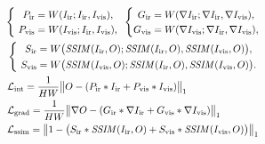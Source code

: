 \begin{gather}
    \left\{
    \scalebox{0.8}{
        $\begin{aligned}
            P_{\mathrm{ir}}   &= W(I_{\mathrm{ir}}; I_{\mathrm{ir}}, I_{\mathrm{vis}}), \\
            P_{\mathrm{vis}}  &= W(I_{\mathrm{vis}}; I_{\mathrm{ir}}, I_{\mathrm{vis}}),
        \end{aligned}$
    }
    \right.
    \left\{
     \scalebox{0.8}{$\begin{aligned}
            G_{\mathrm{ir}}   &= W(\nabla I_{\mathrm{ir}}; \nabla I_{\mathrm{ir}}, \nabla I_{\mathrm{vis}}), \\
            G_{\mathrm{vis}}  &= W(\nabla I_{\mathrm{vis}}; \nabla I_{\mathrm{ir}}, \nabla I_{\mathrm{vis}}),
        \end{aligned}$}
    \right.
    \\
    \left\{
        \scalebox{0.8}{
        $\begin{aligned}
            S_{\mathrm{ir}}   &= W\bigl(\mathit{SSIM}(I_{\mathrm{ir}}, O); \mathit{SSIM}(I_{\mathrm{ir}}, O), \mathit{SSIM}(I_{\mathrm{vis}}, O)\bigr), \\
            S_{\mathrm{vis}}  &= W\bigl(\mathit{SSIM}(I_{\mathrm{vis}}, O); \mathit{SSIM}(I_{\mathrm{ir}}, O), \mathit{SSIM}(I_{\mathrm{vis}}, O)\bigr).
        \end{aligned}
        $}
    \right.
    \\
    \scalebox{0.8}{$
      \begin{aligned}
        &\mathcal{L}_{\mathrm{int}} = \frac{1}{HW} \bigl\| O - (P_{\mathrm{ir}} * I_{\mathrm{ir}} + P_{\mathrm{vis}} * I_{\mathrm{vis}}) \bigr\|_1 \\
        &\mathcal{L}_{\mathrm{grad}} = \frac{1}{HW} \bigl\| \nabla O - (G_{\mathrm{ir}} * \nabla I_{\mathrm{ir}} + G_{\mathrm{vis}} * \nabla I_{\mathrm{vis}}) \bigr\|_1 \\
        &\mathcal{L}_{\mathrm{ssim}} = \bigl\| 1 - \bigl(S_{\mathrm{ir}} * \mathit{SSIM}(I_{\mathrm{ir}}, O) + S_{\mathrm{vis}} * \mathit{SSIM}(I_{\mathrm{vis}}, O)\bigr) \bigr\|_1
        \label{eqn:single_loss}
    \end{aligned}$}
\end{gather}




